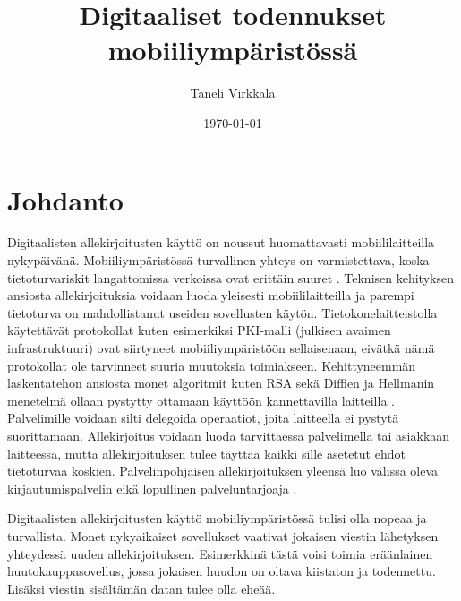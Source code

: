 \documentclass[finnish]{tktltiki2}
\title{Digitaaliset todennukset mobiiliympäristössä}
\author{Taneli Virkkala}
\date{\today}
\theoremstyle{definition}
\theoremstyle{remark}
\begin{document}

\frontmatter      %

\maketitle        %
\makeabstract     %

\tableofcontents  %


\mainmatter       %

\section{Johdanto}


Digitaalisten allekirjoitusten käyttö on noussut huomattavasti mobiililaitteilla nykypäivänä. Mobiiliympäristössä turvallinen yhteys on varmistettava, koska tietoturvariskit langattomissa verkoissa ovat erittäin suuret \cite{enti}. Teknisen kehityksen ansiosta allekirjoituksia voidaan luoda yleisesti mobiililaitteilla ja parempi tietoturva on mahdollistanut useiden sovellusten käytön. Tietokonelaitteistolla käytettävät protokollat kuten esimerkiksi PKI-malli (julkisen avaimen infrastruktuuri) ovat siirtyneet mobiiliympäristöön sellaisenaan, eivätkä nämä protokollat ole tarvinneet suuria muutoksia toimiakseen. Kehittyneemmän laskentatehon ansiosta monet algoritmit kuten RSA sekä Diffien ja Hellmanin menetelmä ollaan pystytty ottamaan käyttöön kannettavilla laitteilla \cite{enti}. Palvelimille voidaan silti delegoida operaatiot, joita laitteella ei pystytä suorittamaan. Allekirjoitus voidaan luoda tarvittaessa palvelimella tai asiakkaan laitteessa, mutta allekirjoituksen tulee täyttää kaikki sille asetetut ehdot tietoturvaa koskien. Palvelinpohjaisen allekirjoituksen yleensä luo välissä oleva kirjautumispalvelin eikä lopullinen palveluntarjoaja \cite{proxy}.

Digitaalisten allekirjoitusten käyttö mobiiliympäristössä tulisi olla nopeaa ja turvallista. Monet nykyaikaiset sovellukset vaativat jokaisen viestin lähetyksen yhteydessä uuden allekirjoituksen. Esimerkkinä tästä voisi toimia eräänlainen huutokauppasovellus, jossa jokaisen huudon on oltava kiistaton ja todennettu. Lisäksi viestin sisältämän datan tulee olla eheää. \cite{proxy}
\end{document}
